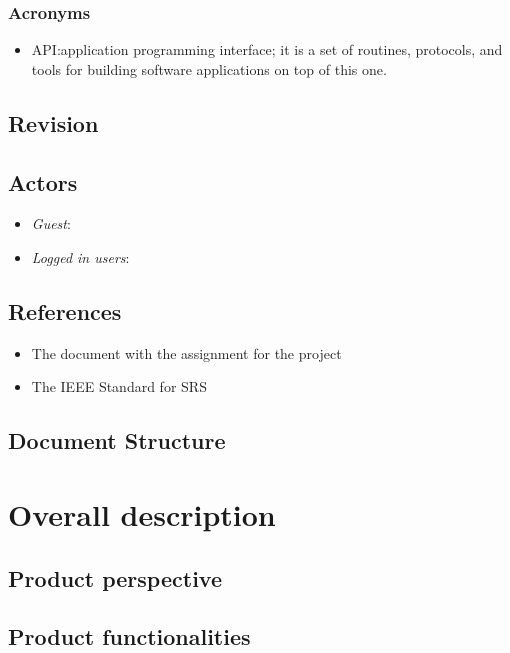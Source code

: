 \documentclass{article}
\begin{document}
\subsubsection{Acronyms}
\begin{itemize}
	\item API:\@ application programming interface; it is a set of routines, protocols, and tools for building software applications on top of this one.
\end{itemize}
	
\subsection{Revision}



\subsection{Actors}
\begin{itemize}
	\item \textit{Guest}: 
	\item \textit{Logged in users}:

\end{itemize}

\subsection{References}
\begin{itemize}
	\item The document with the assignment for the project
	\item The IEEE Standard for SRS 
\end{itemize}
\subsection{Document Structure}


\clearpage
\section{Overall description}

\subsection{Product perspective}



\clearpage

\subsection{Product functionalities}

\end{document}
